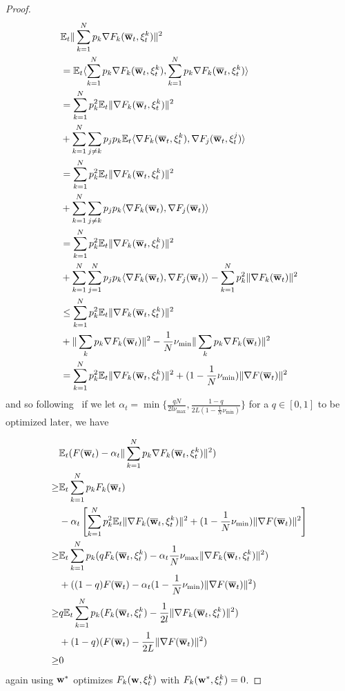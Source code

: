 \begin{proof}
	\begin{align*}
	& \mathbb{E}_{t}\|\sum_{k=1}^{N}p_{k}\nabla F_{k}({\overline{\mathbf{w}}}_{t},\xi_{t}^{k})\|^{2} \\
	& =\mathbb{E}_{t}\langle\sum_{k=1}^{N}p_{k}\nabla F_{k}({\overline{\mathbf{w}}}_{t},\xi_{t}^{k}),\sum_{k=1}^{N}p_{k}\nabla F_{k}({\overline{\mathbf{w}}}_{t},\xi_{t}^{k})\rangle\\
	& =\sum_{k=1}^{N}p_{k}^{2}\mathbb{E}_{t}\|\nabla F_{k}({\overline{\mathbf{w}}}_{t},\xi_{t}^{k})\|^{2}\\
	&+\sum_{k=1}^{N}\sum_{j\neq k}p_{j}p_{k}\mathbb{E}_{t}\langle\nabla F_{k}({\overline{\mathbf{w}}}_{t},\xi_{t}^{k}),\nabla F_{j}({\overline{\mathbf{w}}}_{t},\xi_{t}^{j})\rangle\\
	& =\sum_{k=1}^{N}p_{k}^{2}\mathbb{E}_{t}\|\nabla F_{k}({\overline{\mathbf{w}}}_{t},\xi_{t}^{k})\|^{2}\\
	&+\sum_{k=1}^{N}\sum_{j\neq k}p_{j}p_{k}\langle\nabla F_{k}({\overline{\mathbf{w}}}_{t}),\nabla F_{j}({\overline{\mathbf{w}}}_{t})\rangle\\
	& =\sum_{k=1}^{N}p_{k}^{2}\mathbb{E}_{t}\|\nabla F_{k}({\overline{\mathbf{w}}}_{t},\xi_{t}^{k})\|^{2}\\
	&+\sum_{k=1}^{N}\sum_{j=1}^{N}p_{j}p_{k}\langle\nabla F_{k}({\overline{\mathbf{w}}}_{t}),\nabla F_{j}({\overline{\mathbf{w}}}_{t})\rangle-\sum_{k=1}^{N}p_{k}^{2}\|\nabla F_{k}({\overline{\mathbf{w}}}_{t})\|^{2}\\
	& \leq\sum_{k=1}^{N}p_{k}^{2}\mathbb{E}_{t}\|\nabla F_{k}({\overline{\mathbf{w}}}_{t},\xi_{t}^{k})\|^{2}\\&
	+\|\sum_{k}p_{k}\nabla F_{k}({\overline{\mathbf{w}}}_{t})\|^{2}-\frac{1}{N}\nu_{\min}\|\sum_{k}p_{k}\nabla F_{k}({\overline{\mathbf{w}}}_{t})\|^{2}\\
	& =\sum_{k=1}^{N}p_{k}^{2}\mathbb{E}_{t}\|\nabla F_{k}({\overline{\mathbf{w}}}_{t},\xi_{t}^{k})\|^{2}+(1-\frac{1}{N}\nu_{\min})\|\nabla F({\overline{\mathbf{w}}}_{t})\|^{2}
	\end{align*}
	and so following~\cite{ma2017power} if we let $\alpha_{t}=\min\{\frac{qN}{2l\nu_{\max}},\frac{1-q}{2L(1-\frac{1}{N}\nu_{\min})}\}$
	for a $q\in[0,1]$ to be optimized later, we have 
	
	\begin{align*}
	& \mathbb{E}_{t}(F({\overline{\mathbf{w}}}_{t})-\alpha_{t}\|\sum_{k=1}^{N}p_{k}\nabla F_{k}({\overline{\mathbf{w}}}_{t},\xi_{t}^{k})\|^{2})\\
	\geq&\mathbb{E}_{t}\sum_{k=1}^{N}p_{k}F_{k}({\overline{\mathbf{w}}}_{t})\\
	& -\alpha_{t}\left[\sum_{k=1}^{N}p_{k}^{2}\mathbb{E}_{t}\|\nabla F_{k}({\overline{\mathbf{w}}}_{t},\xi_{t}^{k})\|^{2}+(1-\frac{1}{N}\nu_{\min})\|\nabla F({\overline{\mathbf{w}}}_{t})\|^{2}\right]\\
	\geq&\mathbb{E}_{t}\sum_{k=1}^{N}p_{k}(qF_{k}({\overline{\mathbf{w}}}_{t},\xi_{t}^{k})-\alpha_{t}\frac{1}{N}\nu_{\max}\|\nabla F_{k}({\overline{\mathbf{w}}}_{t},\xi_{t}^{k})\|^{2})\\
	& +((1-q)F({\overline{\mathbf{w}}}_{t})-\alpha_{t}(1-\frac{1}{N}\nu_{\min})\|\nabla F({\overline{\mathbf{w}}}_{t})\|^{2})\\
 \geq &q\mathbb{E}_{t}\sum_{k=1}^{N}p_{k}(F_{k}({\overline{\mathbf{w}}}_{t},\xi_{t}^{k})-\frac{1}{2l}\|\nabla F_{k}({\overline{\mathbf{w}}}_{t},\xi_{t}^{k})\|^{2})\\
 & +(1-q)(F({\overline{\mathbf{w}}}_{t})-\frac{1}{2L}\|\nabla F({\overline{\mathbf{w}}}_{t})\|^{2})\\
 \geq &0
	\end{align*}
	again using ${\mathbf{w}}^{\ast}$ optimizes $F_{k}({\mathbf{w}},\xi_{t}^{k})$ with $F_{k}({\mathbf{w}}^{\ast},\xi_{t}^{k})=0$. 
	

\end{proof}
